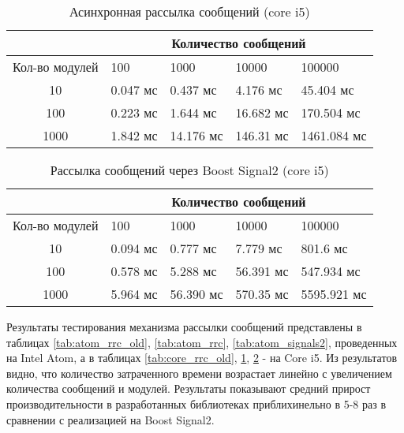 \begin{table}[!htbp]
    \caption{\label{tab:core_rrc}Асинхронная рассылка сообщений (core i5)}
    \begin{center}
        \begin{tabularx}{\textwidth}{|c|X|X|X|X|}
            \hline
            & \multicolumn{4}{|c|}{Количество сообщений} \\
            \hline
            Кол-во модулей & 100   & 1000   & 10000   & 100000   \\
            \hline
            10             & 0.047 мс  & 0.437 мс   & 4.176 мс   & 45.404 мс   \\
            \hline
            100            & 0.223 мс  & 1.644 мс  & 16.682 мс  & 170.504 мс  \\
            \hline
            1000           & 1.842 мс & 14.176 мс & 146.31 мс & 1461.084 мс \\
            \hline
        \end{tabularx}
    \end{center}
\end{table}

\begin{table}[!htbp]
    \caption{\label{tab:core_signals2}Рассылка сообщений через Boost Signal2 (core i5)}
    \begin{center}
        \begin{tabularx}{\textwidth}{|c|X|X|X|X|}
            \hline
            & \multicolumn{4}{|c|}{Количество сообщений} \\
            \hline
            Кол-во модулей & 100   & 1000   & 10000   & 100000   \\
            \hline
            10             & 0.094 мс  & 0.777 мс   & 7.779 мс   & 801.6 мс   \\
            \hline
            100            & 0.578 мс  & 5.288 мс  & 56.391 мс  & 547.934 мс  \\
            \hline
            1000           & 5.964 мс & 56.390 мс & 570.35 мс & 5595.921 мс \\
            \hline
        \end{tabularx}
    \end{center}
\end{table}

Результаты тестирования механизма рассылки сообщений 
представлены в таблицах \ref{tab:atom_rrc_old}, 
\ref{tab:atom_rrc}, \ref{tab:atom_signals2}, проведенных на 
Intel Atom, а в таблицах \ref{tab:core_rrc_old}, 
\ref{tab:core_rrc}, \ref{tab:core_signals2} - на Core i5. Из 
результатов видно, что количество затраченного времени 
возрастает линейно с увеличением количества сообщений и модулей. 
Результаты показывают средний прирост производительности в 
разработанных библиотеках приблихинельно в 5-8 раз в сравнении с 
реализацией на Boost Signal2.


